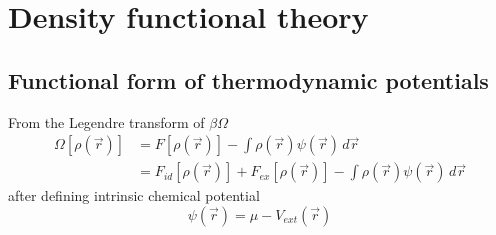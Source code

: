 \section{Density functional theory}

\subsection{Functional form of thermodynamic potentials}

From the Legendre transform of $\beta \Omega$
\begin{equation}
  \begin{aligned}
    \Omega[\rho(\vec{r})] &=
    F[\rho(\vec{r})] -
    \int \rho(\vec{r}) \psi(\vec{r}) \, d\vec{r} \\
    &=
    F_{id}[\rho(\vec{r})] +
    F_{ex}[\rho(\vec{r})] -
    \int \rho(\vec{r}) \psi(\vec{r}) \, d\vec{r}
  \end{aligned}
\end{equation}
after defining intrinsic chemical potential
\begin{equation}\label{eq:intrinsic-chemical-potential}
  \psi(\vec{r}) = \mu - V_{ext}(\vec{r})
\end{equation}

